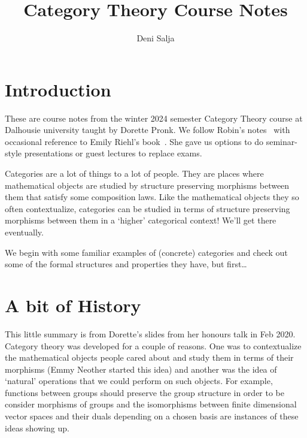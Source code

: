 \documentclass[11pt]{amsart}
\title{Category Theory Course Notes}
\author{Deni Salja}
\theoremstyle{plain}
\theoremstyle{definition}
\newcommand{\noi}{{\noindent}}
\begin{document}
\maketitle



\section*{Introduction}

These are course notes from the winter 2024 semester Category Theory course at Dalhousie university taught by Dorette Pronk. We follow Robin's notes~\cite{Robin'sNotes} with occasional reference to Emily Riehl's book~\cite{CatsinContext}. She gave us options to do seminar-style presentations or guest lectures to replace exams. 


\noi Categories are a lot of things to a lot of people. They are places where mathematical objects are studied by structure preserving morphisms between them that satisfy some composition laws. Like the mathematical objects they so often contextualize, categories can be studied in terms of structure preserving morphisms between them in a `higher' categorical context! We'll get there eventually. 

We begin with some familiar examples of (concrete) categories and check out some of the formal structures and properties they have, but first\dots

\section*{A bit of History}

This little summary is from Dorette's slides from her honours talk in Feb 2020. Category theory was developed for a couple of reasons. One was to contextualize the mathematical objects people cared about and study them in terms of their morphisms (Emmy Neother started this idea) and another was the idea of `natural' operations that we could perform on such objects. For example, functions between groups should preserve the group structure in order to be consider morphisms of groups and the isomorphisms between finite dimensional vector spaces and their duals depending on a chosen basis are instances of these ideas showing up. \par
\end{document}
